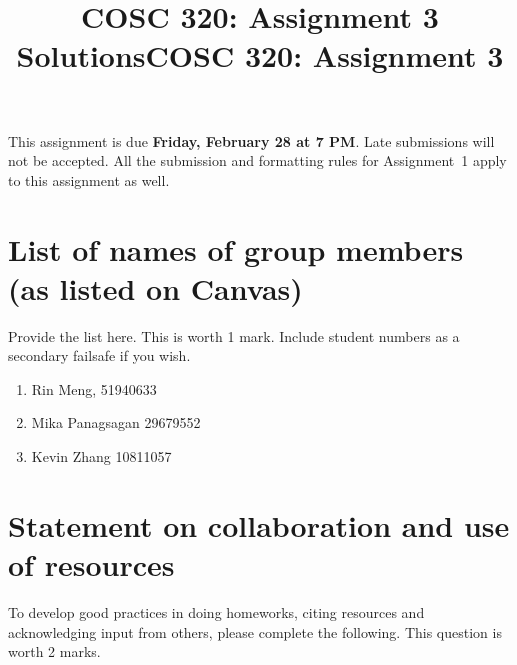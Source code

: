 \documentclass[11pt,fleqn]{exam}
\title{COSC 320: Assignment 3 Solutions}
\title{COSC 320: Assignment 3}
\author{}
\date{}
\newif\ifsolutions\solutionsfalse
\begin{document}
\maketitle
\vspace{-0.5in}

\ifsolutions
\setcounter{section}{2}
\else
This assignment is due \textbf{Friday, February 28 at 7 PM}. Late submissions will not be accepted. All the submission and formatting rules for Assignment~1 apply to this assignment as well.  
\section{List of names of group members (as listed on Canvas)}

Provide the list here. This is worth 1 mark. Include student numbers
as a secondary failsafe if you wish.

\begin{enumerate}
    \item Rin Meng, 51940633
    \item Mika Panagsagan 29679552
     \item Kevin Zhang 10811057
 \end{enumerate}

\section{Statement on collaboration and use of resources}
To develop good practices in doing homeworks,
citing resources and acknowledging input from others, please complete the following.
This question is worth 2 marks.
\end{document}
